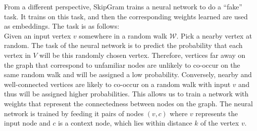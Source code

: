 \documentclass[a4paper]{article}
\begin{document}
From a different perspective, SkipGram trains a neural network to do
a ``fake'' task. It trains on this task, and then the corresponding weights
learned are used as embeddings. The task is as follows:\\
Given an input vertex $v$ somewhere in a random walk $\mathcal{W}$. Pick a
nearby vertex at random. The task of the neural network is to
predict the probability that each vertex in $V$ will be this randomly chosen
vertex. Therefore, vertices far away on the graph that correspond to unfamiliar
nodes are unlikely to co-occur on the same random walk and will be assigned a
low probability. Conversely, nearby and well-connected vertices are likely to
co-occur on a random walk with input $v$ and thus will be assigned higher
probabilities. This allows us to train a network with weights that represent the
connectedness between nodes on the graph. The neural network is trained by
feeding it pairs of nodes $(v, c)$ where $v$ represents the input node and $c$
is a context node, which lies within distance $k$ of the vertex $v$.
\end{document}
